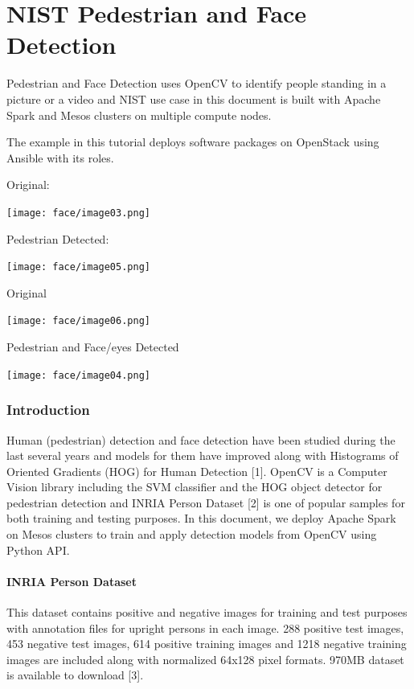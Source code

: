 \chapter{NIST Pedestrian and Face Detection}
\label{c:face}

Pedestrian and Face Detection uses OpenCV to identify people standing in
a picture or a video and NIST use case in this document is built with
Apache Spark and Mesos clusters on multiple compute nodes.

The example in this tutorial deploys software packages on OpenStack
using Ansible with its roles.


Original:

\texttt{[image: face/image03.png]}

Pedestrian Detected:

\texttt{[image: face/image05.png]}

Original

\texttt{[image: face/image06.png]}

Pedestrian and Face/eyes Detected

\texttt{[image: face/image04.png]}

\subsection{Introduction}\label{introduction}

Human (pedestrian) detection and face detection have been studied during
the last several years and models for them have improved along with
Histograms of Oriented Gradients (HOG) for Human Detection {[}1{]}.
OpenCV is a Computer Vision library including the SVM classifier and the
HOG object detector for pedestrian detection and INRIA Person Dataset
{[}2{]} is one of popular samples for both training and testing
purposes. In this document, we deploy Apache Spark on Mesos clusters to
train and apply detection models from OpenCV using Python API.

\subsubsection{INRIA Person Dataset}\label{inria-person-dataset}

This dataset contains positive and negative images for training and test
purposes with annotation files for upright persons in each image. 288
positive test images, 453 negative test images, 614 positive training
images and 1218 negative training images are included along with
normalized 64x128 pixel formats. 970MB dataset is available to download
{[}3{]}.

